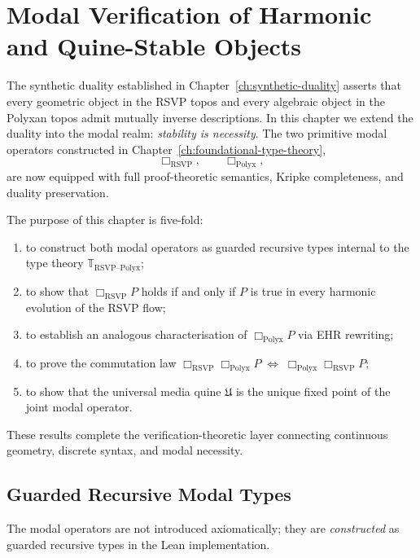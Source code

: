 \chapter{Modal Verification of Harmonic and Quine-Stable Objects}
\label{ch:modal-verification}

The synthetic duality established in Chapter~\ref{ch:synthetic-duality}
asserts that every geometric object in the RSVP topos and every algebraic
object in the Polyxan topos admit mutually inverse descriptions.  
In this chapter we extend the duality into the modal realm:
\emph{stability is necessity}.  
The two primitive modal operators constructed in
Chapter~\ref{ch:foundational-type-theory},
\[
\Box_{\mathrm{RSVP}},\qquad \Box_{\mathrm{Polyx}},
\]
are now equipped with full proof-theoretic semantics, Kripke completeness,
and duality preservation.

The purpose of this chapter is five-fold:

\begin{enumerate}
\item to construct both modal operators as guarded recursive types
      internal to the type theory $\mathbb{T}_{\mathrm{RSVP\text{--}Polyx}}$;
\item to show that $\Box_{\mathrm{RSVP}} P$ holds if and only if
      $P$ is true in every harmonic evolution of the RSVP flow;
\item to establish an analogous characterisation of
      $\Box_{\mathrm{Polyx}} P$ via EHR rewriting;
\item to prove the commutation law
      $\Box_{\mathrm{RSVP}}\Box_{\mathrm{Polyx}} P
       \;\Leftrightarrow\;
       \Box_{\mathrm{Polyx}}\Box_{\mathrm{RSVP}} P$;
\item to show that the universal media quine $\mathfrak{U}$ is the
      unique fixed point of the joint modal operator.
\end{enumerate}

These results complete the verification-theoretic layer connecting
continuous geometry, discrete syntax, and modal necessity.



\section{Guarded Recursive Modal Types}
\label{sec:guarded-modal}

The modal operators are not introduced axiomatically; they are
\emph{constructed} as guarded recursive types in the Lean
implementation.

